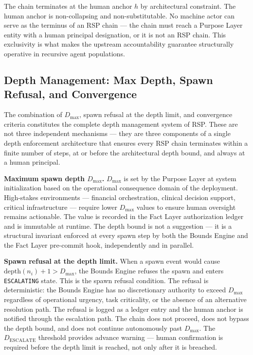 The chain terminates at the human anchor $h$ by architectural constraint. The human anchor is non-collapsing and non-substitutable. No machine actor can serve as the terminus of an RSP chain — the chain must reach a Purpose Layer entity with a human principal designation, or it is not an RSP chain. This exclusivity is what makes the \bxthree{} upstream accountability guarantee structurally operative in recursive agent populations.

\subsection{Depth Management: Max Depth, Spawn Refusal, and Convergence}
\label{sec:rs-depth-management}

The combination of $D_{\max}$, spawn refusal at the depth limit, and convergence criteria constitutes the complete depth management system of RSP. These are not three independent mechanisms — they are three components of a single depth enforcement architecture that ensures every RSP chain terminates within a finite number of steps, at or before the architectural depth bound, and always at a human principal.

\medskip
\noindent\textbf{Maximum spawn depth $D_{\max}$.} $D_{\max}$ is set by the Purpose Layer at system initialization based on the operational consequence domain of the deployment. High-stakes environments — financial orchestration, clinical decision support, critical infrastructure — require lower $D_{\max}$ values to ensure human oversight remains actionable. The value is recorded in the Fact Layer authorization ledger and is immutable at runtime. The depth bound is not a suggestion — it is a structural invariant enforced at every spawn step by both the Bounds Engine and the Fact Layer pre-commit hook, independently and in parallel.

\medskip
\noindent\textbf{Spawn refusal at the depth limit.} When a spawn event would cause $\text{depth}(n_i) + 1 > D_{\max}$, the Bounds Engine refuses the spawn and enters \texttt{ESCALATING} state. This is the spawn refusal condition. The refusal is deterministic: the Bounds Engine has no discretionary authority to exceed $D_{\max}$ regardless of operational urgency, task criticality, or the absence of an alternative resolution path. The refusal is logged as a ledger entry and the human anchor is notified through the escalation path. The chain does not proceed, does not bypass the depth bound, and does not continue autonomously past $D_{\max}$. The $D_{\text{ESCALATE}}$ threshold provides advance warning — human confirmation is required before the depth limit is reached, not only after it is breached.

